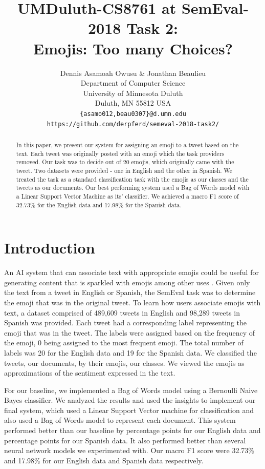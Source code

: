 \documentclass[11pt,a4paper]{article}
\title{UMDuluth-CS8761 at SemEval-2018 Task 2:\\
Emojis: Too many Choices? \winksmile}
\author{
  Dennis Asamoah Owusu \& Jonathan Beaulieu \\
  Department of Computer Science \\
  University of Minnesota Duluth \\
  Duluth, MN 55812 USA \\
  {\tt \{asamo012,beau0307\}@d.umn.edu} \\
  {\tt https://github.com/derpferd/semeval-2018-task2/} \\
}
\date{}
\begin{document}
\maketitle
\begin{abstract}
In this paper, we present our system for assigning an emoji to a tweet based on the text. Each tweet was originally posted with an emoji which the task providers removed. Our task was to decide out of 20 emojis, which originally came with the tweet. Two datasets were provided - one in English and the other in Spanish. We treated the task as a standard classification task with the emojis as our classes and the tweets as our documents. Our best performing system used a Bag of Words model with a Linear Support Vector Machine as its' classifier. We achieved a macro F1 score of 32.73\% for the English data and 17.98\% for the Spanish data.
   
\end{abstract}

\section{Introduction}

An AI system that can associate text with appropriate emojis could be useful for generating content that is sparkled with emojis among other uses \cite{Barb:17}. Given only the text from a tweet in English or Spanish, the SemEval \cite{semeval2018task2} task was to determine the emoji that was in the original tweet. To learn how users associate emojis with text, a dataset comprised of 489,609 tweets in English and 98,289 tweets in Spanish was provided. Each tweet had a corresponding label representing the emoji that was in the tweet. The labels were assigned based on the frequency of the emoji, 0 being assigned to the most frequent emoji. The total number of labels was 20 for the English data and 19 for the Spanish data. We classified the tweets, our documents, by their emojis, our classes. We viewed the emojis as approximations of the sentiment expressed in the text.

For our baseline, we implemented a Bag of Words model using a Bernoulli Naive Bayes classifier. We analyzed the results and used the insights to implement our final system, which used a Linear Support Vector machine for classification and also used a Bag of Words model to represent each document. This system performed better than our baseline by  percentage points for our English data and  percentage points for our Spanish data. It also performed better than several neural network models we experimented with. Our macro F1 score were 32.73\% and 17.98\% for our English data and Spanish data respectively.
\end{document}
